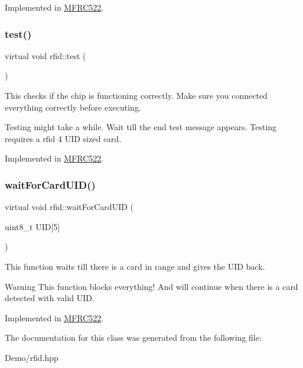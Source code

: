 Implemented in \mbox{\hyperlink{class_m_f_r_c522_adcc4f5eb212c1a94e462eab459bd685e}{M\+F\+R\+C522}}.

\mbox{\label{classrfid_adc4009859b77330fd5b3d0515337ac40}} 
\subsubsection{\texorpdfstring{test()}{test()}}
{\footnotesize\ttfamily virtual void rfid\+::test (\begin{DoxyParamCaption}{ }\end{DoxyParamCaption})\hspace{0.3cm}{\ttfamily [pure virtual]}}



This checks if the chip is functioning correctly. Make sure you connected everything correctly before executing. 

Testing might take a while. Wait till the end test message appears. Testing requires a rfid 4 U\+ID sized card. 

Implemented in \mbox{\hyperlink{class_m_f_r_c522_aff8e84921e9f133cfbd243ce994da023}{M\+F\+R\+C522}}.

\mbox{\label{classrfid_a1b324cb1e7b4c377eca4b3495d4189fd}} 
\subsubsection{\texorpdfstring{wait\+For\+Card\+U\+I\+D()}{waitForCardUID()}}
{\footnotesize\ttfamily virtual void rfid\+::wait\+For\+Card\+U\+ID (\begin{DoxyParamCaption}\item[{uint8\+\_\+t}]{U\+ID\mbox{[}5\mbox{]} }\end{DoxyParamCaption})\hspace{0.3cm}{\ttfamily [pure virtual]}}



This function waits till there is a card in range and gives the U\+ID back. 

\begin{DoxyWarning}{Warning}
This function blocks everything! And will continue when there is a card detected with valid U\+ID. 
\end{DoxyWarning}


Implemented in \mbox{\hyperlink{class_m_f_r_c522_aeb05c83c2d139eb2c57f400399982691}{M\+F\+R\+C522}}.



The documentation for this class was generated from the following file\+:\begin{DoxyCompactItemize}
\item 
Demo/rfid.\+hpp\end{DoxyCompactItemize}
